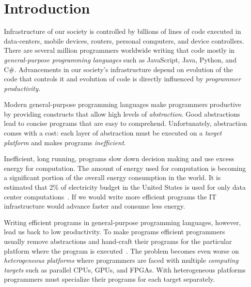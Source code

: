 \chapter{Introduction}
\label{sct:introduction}

Infrastructure of our society is controlled by billions of lines of code executed in data-centers,
 mobile devices, routers, personal computers, and device controllers. There are
 several million programmers worldwide writing that code mostly
 in \emph{general-purpose programming languages} such as JavaScript, Java, Python,
 and C\#. Advancements in our society's infrastructure depend on evolution of the code that controls it and
 evolution of code is directly influenced by \emph{programmer productivity}.


Modern general-purpose programming languages make programmers productive by
 providing constructs that allow high levels of \emph{abstraction}. Good abstractions lead to
 concise programs that are easy to comprehend. Unfortunately, abstraction comes with a cost: each layer of
 abstraction must be executed on a \emph{target platform} and makes programs \emph{inefficient}.

Inefficient, long running, programs slow down decision making and use excess energy
 for computation. The amount of energy used for computation is becoming a significant
 portion of the overall energy consumption in the world. It is estimated that 2\% of
 electricity budget in the United States is used for only data center computations~\cite{mukherjee2009spatio}. If
 we would write more efficient programs the IT infrastructure would advance faster and consume less energy.

Writing efficient programs in general-purpose programming languages, however, lead us back to
 low productivity. To make programs efficient programmers usually remove abstractions and
 hand-craft their programs for the particular platform where the program is executed~\cite{lee2011implementing}.
 The problem becomes even worse on \emph{heterogeneous platforms} where programmers are faced with multiple \emph{computing targets} such as parallel CPUs, GPUs, and FPGAs. With heterogeneous platforms programmers must specialize their programs for each target separately.

